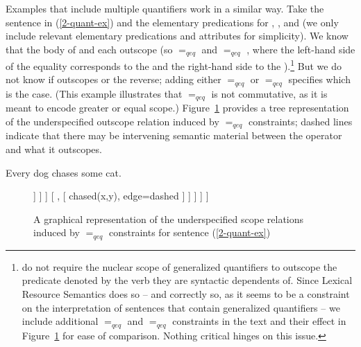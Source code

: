 \documentclass[output=paper
	        ,collection
	        ,collectionchapter
 	        ,biblatex
                ,babelshorthands
                ,newtxmath
                ,draftmode
                ,colorlinks, citecolor=brown
]{langscibook}
\begin{document}
Examples that include multiple quantifiers work in a similar way. Take the sentence in (\ref{2-quant-ex}) and the elementary predications for , , and  (we only include relevant elementary predications and attributes for simplicity). We know that the body of  and  each outscope  (so  $=_{qeq}$  and  $=_{qeq}$ , where the left-hand side of the equality corresponds to the  and the right-hand side to the ).\footnote{\citet{Copestakeetal2005} do not require the nuclear scope of generalized quantifiers to outscope the predicate denoted by the verb they are syntactic dependents of. Since Lexical Resource Semantics does so -- and correctly so, as it seems to be a constraint on the interpretation of  sentences that contain generalized quantifiers -- we include additional  $=_{qeq}$  and  $=_{qeq}$  constraints in the text and their effect in Figure~\ref{fig:MRS-tree} for ease of comparison. Nothing critical hinges on this issue.} But we do not know if  outscopes  or the reverse; adding either   $=_{qeq}$  or  $=_{qeq}$  specifies which is the case. (This example illustrates that $=_{qeq}$ is not commutative, as it is meant to encode greater or equal scope.) Figure~\ref{fig:MRS-tree} provides a tree representation of the underspecified outscope relation induced by $=_{qeq}$ constraints; dashed lines indicate that there may be intervening semantic material between the operator and what it outscopes.

\begin{exe}
\ex\label{2-quant-ex}Every dog chases some cat.
\ex\label{2-quant-sem}
\end{exe}

\begin{figure}
\begin{forest}
[ top
[ {chased(x,y)}, edge=dashed
	[ every, no edge
		[ dog(x), edge=dashed ]
		[ {}, no edge 
				[ some(y), no edge 
					[ cat (y), edge=dashed ] 
					[ {}, [ {chased(x,y)}, edge=dashed	 ] ] ] ] 
		[ {}, [ {chased(x,y)}, edge=dashed ] ]			
					] 
	]
	]
\end{forest}
\caption{\label{fig:MRS-tree}A graphical representation of the underspecified scope relations induced by $=_{qeq}$ constraints for sentence (\ref{2-quant-ex})}
\end{figure}
\end{document}
